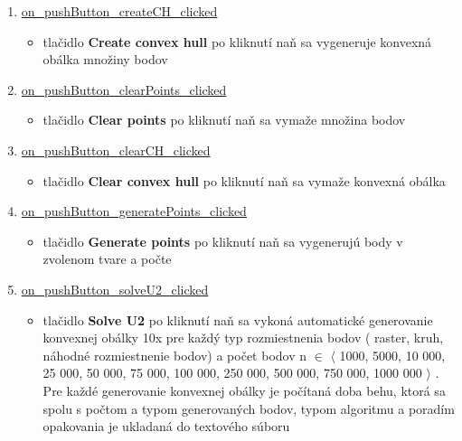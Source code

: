 \documentclass[12pt]{article}
\begin{document}
\begin{enumerate}
\item[] \underline{on\_pushButton\_createCH\_clicked}
\begin{itemize}
\item tlačidlo \textbf{Create convex hull} po kliknutí naň sa vygeneruje konvexná obálka množiny bodov
\end{itemize}

\item[] \underline{on\_pushButton\_clearPoints\_clicked}
\begin{itemize}
\item tlačidlo \textbf{Clear points}  po kliknutí naň sa vymaže množina bodov
\end{itemize}

\item[] \underline{on\_pushButton\_clearCH\_clicked}
\begin{itemize}
\item tlačidlo \textbf{Clear convex hull}  po kliknutí naň sa vymaže konvexná obálka
\end{itemize}

\item[] \underline{on\_pushButton\_generatePoints\_clicked}
\begin{itemize}
\item tlačidlo \textbf{Generate points}  po kliknutí naň sa vygenerujú body v zvolenom tvare a počte
\end{itemize}

\item[] \underline{on\_pushButton\_solveU2\_clicked}
\begin{itemize}
\item tlačidlo \textbf{Solve U2}  po kliknutí naň sa vykoná automatické generovanie konvexnej obálky 10x pre každý typ rozmiestnenia bodov ( raster, kruh, náhodné rozmiestnenie bodov) a počet bodov n $\in$ $\langle$ 1000, 5000, 10 000, 25 000, 50 000, 75 000, 100 000, 250 000, 500 000, 750 000, 1000 000 $\rangle$ . Pre každé generovanie konvexnej obálky je počítaná doba behu, ktorá sa spolu s počtom a typom generovaných bodov, typom algoritmu a poradím opakovania je ukladaná do textového súboru
\end{itemize}

\end{enumerate}

\clearpage
\end{document}
